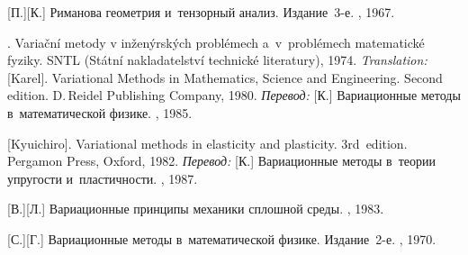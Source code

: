 \begin{thebibliography}{123}
\begin{otherlanguage}{russian}
[П.][К.] Риманова геометрия и~тензорный анализ. Издание~3\hbox{-}е. \naukapublisher, 1967. 

%
%



. Varia\v{c}ní metody v in\v{z}en\'{y}rsk\'{y}ch probl\'{e}mech a~v~pro\-bl\'{e}\-mech matematick\'{e} fyziky. SNTL (St\'{a}tní nakladatelství technick\'{e} literatury), 1974. 
\emph{Translation:}
[Karel]. Variational Methods in Mathematics, Science and Engineering. Second edition. D.\,Reidel Publishing Company, 1980. 
\emph{Перевод:}
[К.] Вариационные методы в~математической физике. \mirpublisher, 1985. 

[Kyuichiro]. Variational methods in elasticity and plasticity. 3rd~edition. Pergamon Press, Oxford, 1982. 
\emph{Перевод:} [К.] Вариационные методы в~теории упругости и~пластичности. \mirpublisher, 1987. 

[В.][Л.] Вариационные принципы механики сплошной среды. \naukapublisher, 1983. 

[С.][Г.] Вариационные методы в~математической физике. Издание~2\hbox{-}е. \naukapublisher, 1970. 

%
%




\end{otherlanguage}
\end{thebibliography}
